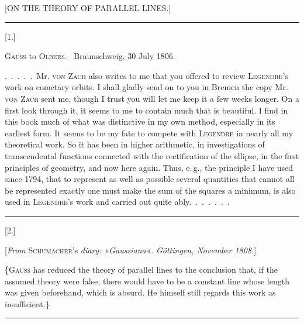 \clearpage
{}\centerline{[ON THE THEORY OF PARALLEL LINES.]}

\bigskip
\hrule
\bigskip

\centerline{[1.]}

\smallskip

\centerline{\textsc{Gauss} to \textsc{Olbers}. \ Braunschweig, 30 July 1806.}

\smallskip

.\ .\ .\ .\ .\ Mr. \textsc{von Zach} also writes to me that you offered to review \textsc{Legendre}'s work on cometary orbits. I shall gladly send on to you in Bremen the copy Mr. \textsc{von Zach} sent me, though I trust you will let me keep it a few weeks longer. On a first look through it, it seems to me to contain much that is beautiful. I find in this book much of what was distinctive in my own method, especially in its earliest form. It seems to be my fate to compete with \textsc{Legendre} in nearly all my theoretical work. So it has been in higher arithmetic, in investigations of transcendental functions connected with the rectification of the ellipse, in the first principles of geometry, and now here again. Thus, e.\,g., the principle I have used since 1794, that to represent as well as possible several quantities that cannot all be represented exactly one must make the sum of the squares a minimum, is also used in \textsc{Legendre}'s work and carried out quite ably.\ .\ .\ .\ .\ .\ .

\bigskip
\hrule
\bigskip

\centerline{[2.]}

\smallskip

\centerline{[\emph{From} \textsc{Schumacher}'s \emph{diary: »Gaussiana«. Göttingen, November 1808.}]}

\smallskip

\{\textsc{Gauss} has reduced the theory of parallel lines to the conclusion that, if the assumed theory were false, there would have to be a constant line whose length was given beforehand, which is absurd. He himself still regards this work as insufficient.\}

\bigskip
\hrule
